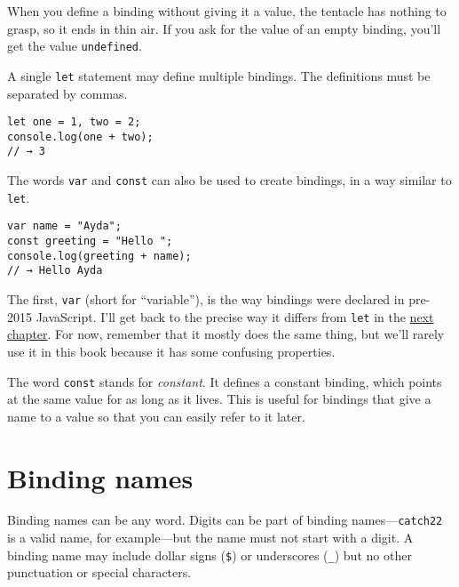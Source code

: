 When you define a binding without giving it a value, the tentacle has nothing to grasp, so it ends in thin air. If you ask for the value of an empty binding, you'll get the value \lstinline`undefined`.

A single \lstinline`let` statement may define multiple bindings. The definitions must be separated by commas.

\begin{lstlisting}
let one = 1, two = 2;
console.log(one + two);
// → 3
\end{lstlisting}
\noindent

The words \lstinline`var` and \lstinline`const` can also be used to create bindings, in a way similar to \lstinline`let`.

\begin{lstlisting}
var name = "Ayda";
const greeting = "Hello ";
console.log(greeting + name);
// → Hello Ayda
\end{lstlisting}
\noindent{}

The first, \lstinline`var` (short for ``variable''), is the way bindings were declared in pre-2015 JavaScript. I'll get back to the precise way it differs from \lstinline`let` in the \hyperref[functions]{next chapter}. For now, remember that it mostly does the same thing, but we'll rarely use it in this book because it has some confusing properties.

The word \lstinline`const` stands for \emph{constant}. It defines a constant binding, which points at the same value for as long as it lives. This is useful for bindings that give a name to a value so that you can easily refer to it later.

\section{Binding names}

Binding names can be any word. Digits can be part of binding names—\lstinline`catch22` is a valid name, for example—but the name must not start with a digit. A binding name may include dollar signs (\lstinline`$`) or underscores (\lstinline`_`) but no other punctuation or special characters.

